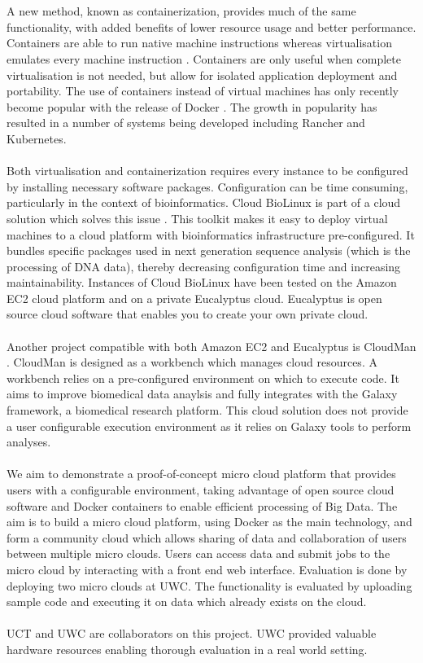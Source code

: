 \documentclass{sig-alternate-05-2015}
\begin{document}
\\\\
A new method, known as containerization, provides much of the same functionality, with added benefits of lower resource usage and better performance. Containers are able to run native machine instructions whereas virtualisation emulates every machine instruction \cite{dua2014virtualization}. Containers are only useful when complete virtualisation is not needed, but allow for isolated application deployment and portability. The use of containers instead of virtual machines has only recently become popular with the release of Docker \cite{marmolnetworking}. The growth in popularity has resulted in a number of systems being developed including Rancher and Kubernetes. 
\\\\
Both virtualisation and containerization requires every instance to be configured by installing necessary software packages. Configuration can be time consuming, particularly in the context of bioinformatics. Cloud BioLinux is part of a cloud solution which solves this issue \cite{krampis2012cloud}. This toolkit makes it easy to deploy virtual machines to a cloud platform with bioinformatics infrastructure pre-configured. It bundles specific packages used in next generation sequence analysis (which is the processing of DNA data), thereby decreasing configuration time and increasing maintainability. Instances of Cloud BioLinux have been tested on the Amazon EC2 cloud platform and on a private Eucalyptus cloud. Eucalyptus is open source cloud software that enables you to create your own private cloud.
\\\\
Another project compatible with both Amazon EC2 and Eucalyptus is CloudMan \cite{afgan2015building}. CloudMan is designed as a workbench which manages cloud resources. A workbench relies on a pre-configured environment on which to execute code. It aims to improve biomedical data anaylsis and fully integrates with the Galaxy framework, a biomedical research platform. This cloud solution does not provide a user configurable execution environment as it relies on Galaxy tools to perform analyses. 
\\\\
We aim to demonstrate a proof-of-concept micro cloud platform that provides users with a configurable environment, taking advantage of open source cloud software and Docker containers to enable efficient processing of Big Data. The aim is to build a micro cloud platform, using Docker as the main technology, and form a community cloud which allows sharing of data and collaboration of users between multiple micro clouds. Users can access data and submit jobs to the micro cloud by interacting with a front end web interface. Evaluation is done by deploying two micro clouds at UWC. The functionality is evaluated by uploading sample code and executing it on data which already exists on the cloud.
\\\\
UCT and UWC are collaborators on this project. UWC provided valuable hardware resources enabling thorough evaluation in a real world setting.
\end{document}
